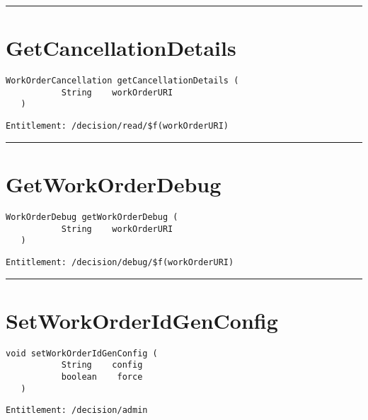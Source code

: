 \rule{12cm}{2pt}
\section{GetCancellationDetails}
\label{Api:GetCancellationDetails}
\begin{lstlisting}[style=nonumbers]
   WorkOrderCancellation getCancellationDetails (
           String    workOrderURI
   )
\end{lstlisting}
\begin{Verbatim}[formatcom=\color{Maroon}]
  Entitlement: /decision/read/$f(workOrderURI)
\end{Verbatim}



\rule{12cm}{2pt}
\section{GetWorkOrderDebug}
\label{Api:GetWorkOrderDebug}
\begin{lstlisting}[style=nonumbers]
   WorkOrderDebug getWorkOrderDebug (
           String    workOrderURI
   )
\end{lstlisting}
\begin{Verbatim}[formatcom=\color{Maroon}]
  Entitlement: /decision/debug/$f(workOrderURI)
\end{Verbatim}



\rule{12cm}{2pt}
\section{SetWorkOrderIdGenConfig}
\label{Api:SetWorkOrderIdGenConfig}
\begin{lstlisting}[style=nonumbers]
   void setWorkOrderIdGenConfig (
           String    config
           boolean    force
   )
\end{lstlisting}
\begin{Verbatim}[formatcom=\color{Maroon}]
  Entitlement: /decision/admin
\end{Verbatim}



